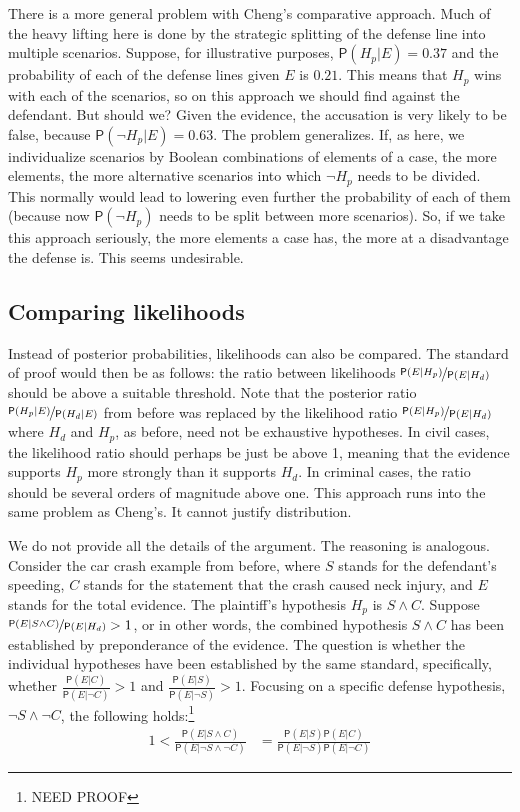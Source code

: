\documentclass[
  10pt,
  dvipsnames,enabledeprecatedfontcommands]{scrartcl}
\newcommand{\n}{\neg}
\newcommand{\et}{\wedge}
\newcommand{\pr}[1]{\ensuremath{\mathsf{P}(#1)}}
\begin{document}
There is a more general problem with Cheng's comparative approach. Much
of the heavy lifting here is done by the strategic splitting of the
defense line into multiple scenarios. Suppose, for illustrative
purposes, \(\pr{H_p\vert E}=0.37\) and the probability of each of the
defense lines given \(E\) is \(0.21\). This means that \(H_p\) wins with
each of the scenarios, so on this approach we should find against the
defendant. But should we? Given the evidence, the accusation is very
likely to be false, because \(\pr{\n H_p \vert E}=0.63\). The problem
generalizes. If, as here, we individualize scenarios by Boolean
combinations of elements of a case, the more elements, the more
alternative scenarios into which \(\n H_p\) needs to be divided. This
normally would lead to lowering even further the probability of each of
them (because now \(\pr{\n H_p}\) needs to be split between more
scenarios). So, if we take this approach seriously, the more elements a
case has, the more at a disadvantage the defense is. This seems
undesirable.

\hypertarget{comparing-likelihoods}{%
\subsection{Comparing likelihoods}\label{comparing-likelihoods}}

Instead of posterior probabilities, likelihoods can also be compared.
The standard of proof would then be as follows: the ratio between
likelihoods \(\nicefrac{\pr{E \vert H_p}}{\pr{E \vert H_d}}\) should be
above a suitable threshold. Note that the posterior ratio
\(\nicefrac{\pr{H_p \vert E}}{\pr{H_d \vert E}}\) from before was
replaced by the likelihood ratio
\(\nicefrac{\pr{E \vert H_p}}{\pr{E \vert H_d}}\) where \(H_d\) and
\(H_p\), as before, need not be exhaustive hypotheses. In civil cases,
the likelihood ratio should perhaps be just be above 1, meaning that the
evidence supports \(H_p\) more strongly than it supports \(H_d\). In
criminal cases, the ratio should be several orders of magnitude above
one. This approach runs into the same problem as Cheng's. It cannot
justify distribution.

We do not provide all the details of the argument. The reasoning is
analogous. Consider the car crash example from before, where \(S\)
stands for the defendant's speeding, \(C\) stands for the statement that
the crash caused neck injury, and \(E\) stands for the total evidence.
The plaintiff's hypothesis \(H_p\) is \(S\et C\). Suppose
\(\nicefrac{\pr{E \vert S\et C}}{\pr{E \vert H_d}}>1\), or in other
words, the combined hypothesis \(S \et C\) has been established by
preponderance of the evidence. The question is whether the individual
hypotheses have been established by the same standard, specifically,
whether \(\frac{\pr{E \vert C}}{\pr{E\vert \neg C}} > 1\) and
\(\frac{\pr{E \vert S}}{\pr{E\vert \neg S}} > 1\). Focusing on a
specific defense hypothesis, \(\n S\et \n C\), the following
holds:\footnote{NEED PROOF}
\begin{align}\label{eq:lr-multiplication-two}
1 < \frac{\pr{E \vert S\et C}}{\pr{E\vert \n S\et \n C}} & = \frac{\pr{E\vert S}\pr{E\vert C}}{\pr{ E \vert \n S}\pr{E \vert \n C}}   
\end{align}
\end{document}
